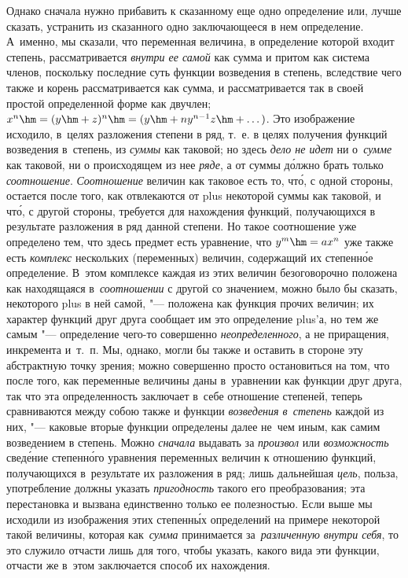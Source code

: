 Однако сначала нужно прибавить к сказанному еще одно определение или, лучше
сказать, устранить из сказанного одно заключающееся в нем определение.
А~именно, мы сказали, что переменная величина, в определение которой входит
степень, рассматривается {\em внутри ее самой} как сумма и притом как система
членов, поскольку последние суть функции возведения в степень, вследствие чего
также и корень рассматривается как сумма, и рассматривается так в своей простой
определенной форме как двучлен;
$x^n\hm=(y\hm+z)^n\hm=(y\hm+ny^{n-1}z\hm+\dots)$. Это изображение исходило,
в~целях разложения степени в ряд, т.~е. в целях получения функций возведения
в~степень, из {\em суммы} как таковой; но здесь {\em дело не идет} ни
о~{\em сумме} как таковой, ни о происходящем из нее {\em ряде}, а от суммы
д\'{о}лжно брать только {\em соотношение}. {\em Соотношение} величин как
таковое есть то, чт\'{о}, с одной стороны, остается после того, как отвлекаются от
plus некоторой суммы как таковой, и чт\'{о}, с другой стороны, требуется для
нахождения функций, получающихся в результате разложения в ряд данной степени.
Но такое соотношение уже определено тем, что здесь предмет есть уравнение, что
$y^m\hm=ax^n$ уже также есть {\em комплекс} нескольких (переменных) величин,
содержащий их степенн\'{о}е определение. В~этом комплексе каждая из этих
величин безоговорочно положена как находящаяся в~{\em соотношении} с другой со
значением, можно было бы сказать, некоторого plus в ней самой, "--- положена
как функция прочих величин; их характер функций друг друга сообщает им это
определение plus'а, но тем же самым "--- определение чего-то совершенно
{\em неопределенного}, а не приращения, инкремента и~т.~п. Мы, однако, могли бы
также и оставить в стороне эту абстрактную точку зрения; можно совершенно
просто остановиться на том, что после того, как переменные величины даны
в~уравнении как функции друг друга, так что эта определенность заключает в~себе
отношение степеней, теперь сравниваются между собою также и функции
{\em возведения в~степень} каждой из них, "--- каковые вторые функции
определены далее не~чем иным, как самим возведением в степень. Можно
{\em сначала} выдавать за {\em произвол} или {\em возможность} свед\'{е}ние
степенн\'{о}го уравнения переменных величин к отношению функций, получающихся
в~результате их разложения в ряд; лишь дальнейшая {\em цель}, польза,
употребление должны указать {\em пригодность} такого его преобразования; эта
перестановка и вызвана единственно только ее полезностью. Если выше мы исходили
из изображения этих степенн\'{ы}х определений на примере некоторой такой величины,
которая как~{\em сумма} принимается за~{\em различенную внутри себя}, то это
служило отчасти лишь для того, чтобы указать, какого вида эти функции, отчасти
же в~этом заключается способ их нахождения.

